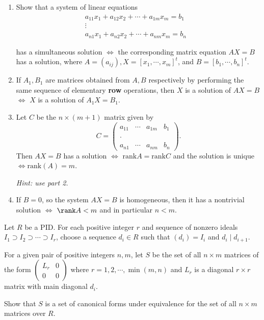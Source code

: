 \begin{problem}[Hungerford 7.2.4]
\label{prob:1.1}
\hfill
\begin{enumerate}
    \item Show that a system of linear equations
$$
\begin{array}{l}{a_{11} x_{1}+a_{12} x_{2}+\cdots+a_{1 m} x_{m}=b_{1}} \\ \vdots & \\ {a_{n 1} x_{1}+a_{n 2} x_{2}+\cdots+a_{n m} x_{m}=b_{n}}\end{array}
$$

has a simultaneous solution $\iff$ the corresponding matrix equation $AX = B$ has a solution, where $A = (a_{ij}), X = [x_1, \cdots, x_m]^t$, and $B = [b_1, \cdots , b_n]^t$.

    \item If $A_1, B_1$ are matrices obtained from $A, B$ respectively by performing the same sequence of elementary \textbf{row} operations, then $X$ is a solution of $AX=B$ $\iff$ $X$ is a solution of $A_1 X = B_1$.
    
    \item Let $C$ be the $n \times (m+1)$ matrix given by 
    $$
    C = \left(\begin{array}{llll}{a_{11}} & {\cdots} & {a_{1 m}} & {b_{1}} \\ {} & {} & {} \\ {\cdot} & {} & {} \\ {a_{n 1}} & {\cdots} & {a_{n m}} & {b_{n}}\end{array}\right).
    $$
    Then $AX = B$ has a solution $\iff$ $\mathrm{rank} A = \mathrm{rank} C$ and the solution is unique $\iff \mathrm{rank}(A) = m$.
    
    \textit{Hint: use part 2.}
    
    \item If $B=0$, so the system $AX=B$ is homogeneous, then it has a nontrivial solution $\iff$ $\rank A < m$ and in particular $n<m$.
\end{enumerate}

\end{problem}

\begin{problem}[Hungerford 7.2.5]
\label{prob:1.1}
Let $R$ be a PID. For each positive integer $r$ and sequence of nonzero ideals $I_1 \supset I_2 \supset \cdots \supset I_r$, choose a sequence $d_i \in R$ such that $(d_i) = I_i$ and $d_i \mid d_{i+1}$.

For a given pair of positive integers $n, m$, let $S$ be the set of all $n\times m$ matrices of the form $\left(\begin{array}{ll}{L_{r}} & {0} \\ {0} & {0}\end{array}\right)$ where $r=1,2,\cdots,\min(m,n)$ and $L_r$ is a diagonal $r\times r$ matrix with main diagonal $d_i$.

Show that $S$ is a set of canonical forms under equivalence for the set of all $n\times m$ matrices over $R$.
\end{problem}

